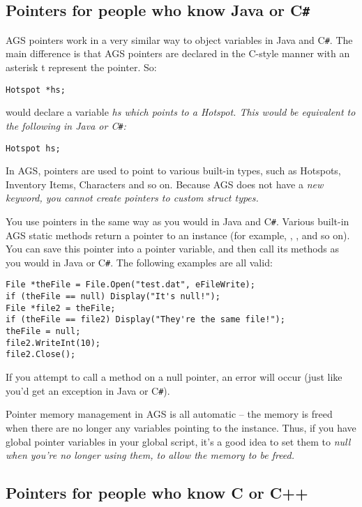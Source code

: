 \subsection{Pointers for people who know Java or C\verb$#$}\label{PointersForJavaCSharp}%

AGS pointers work in a very similar way to object variables in Java and C\verb$#$. The main
difference is that AGS pointers are declared in the C-style manner with an asterisk t
represent the pointer. So:
\begin{verbatim}
Hotspot *hs;
\end{verbatim}
would declare a variable \it{hs} which points to a Hotspot. This would be equivalent to
the following in Java or C\verb$#$:
\begin{verbatim}
Hotspot hs;
\end{verbatim}
In AGS, pointers are used to point to various built-in types, such as Hotspots, Inventory Items,
Characters and so on. Because AGS does not have a \it{new} keyword, you cannot create pointers
to custom struct types.

You use pointers in the same way as you would in Java and C\verb$#$. Various built-in AGS static
methods return a pointer to an instance (for example, ,
, and so on). You can save this
pointer into a pointer variable, and then call its methods as you would in Java or C\verb$#$.
The following examples are all valid:
\begin{verbatim}
File *theFile = File.Open("test.dat", eFileWrite);
if (theFile == null) Display("It's null!");
File *file2 = theFile;
if (theFile == file2) Display("They're the same file!");
theFile = null;
file2.WriteInt(10);
file2.Close();
\end{verbatim}
If you attempt to call a method on a null pointer, an error will occur (just like you'd
get an exception in Java or C\verb$#$).

Pointer memory management in AGS is all automatic -- the memory is freed when there are
no longer any variables pointing to the instance. Thus, if you have global pointer variables
in your global script, it's a good idea to set them to \it{null} when you're no longer
using them, to allow the memory to be freed.


\subsection{Pointers for people who know C or C++}\label{PointersForC}%

